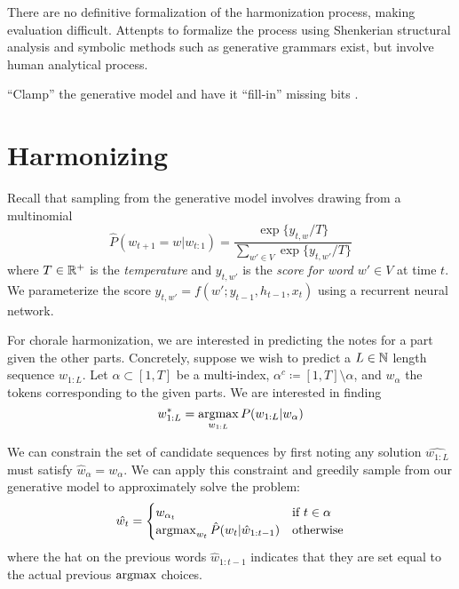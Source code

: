 \documentclass[dissertation.tex]{subfiles}
\begin{document}
There are no definitive formalization of the harmonization process, making
evaluation difficult. Attenpts to formalize the process using Shenkerian
structural analysis \cite{oswald1973harmony} and symbolic methods such as
generative grammars \cite{lerdahl1983jackendoff}\cite{winograd1968linguistics}
exist, but involve human analytical process.

``Clamp'' the generative model and have it ``fill-in'' missing bits
\cite{hinton1986learning}.

\section{Harmonizing}

Recall that sampling from the generative model involves drawing from a multinomial
\[
  \hat{P}(w_{t+1} = w | w_{t:1}) = \frac{\exp \{ y_{t,w} / T \}}{\sum_{w' \in V} \exp \{ y_{t,w'} / T \}}
\]
where $T \in \mathbb{R}^+$ is the \emph{temperature} and $y_{t,w'}$ is the \emph{score for word $w' \in V$}
at time $t$. We parameterize the score $y_{t,w'} = f(w'; y_{t-1}, h_{t-1}, x_t)$ using a recurrent
neural network.


For chorale harmonization, we are interested in predicting the notes for a part
given the other parts. Concretely, suppose we wish to predict a $L \in \mathbb{N}$
length sequence $w_{1:L}$. Let $\alpha \subset [1,T]$ be a multi-index,
$\alpha^c \coloneqq [1,T] \setminus \alpha$, and $w_\alpha$ the tokens
corresponding to the given parts. We are interested in finding
\begin{equation}
  w_{1:L}^* = \operatorname*{argmax}_{w_{1:L}} P(w_{1:L} | w_{\alpha})
\end{equation}

We can constrain the set of candidate sequences by first noting any solution
$\hat{w_{1:L}}$ must satisfy $\hat{w}_\alpha = w_\alpha$. We can apply this
constraint and greedily sample from our generative model to approximately solve
the problem:
\begin{equation}
  \hat{w_{t}} = \begin{cases}
    w_{\alpha_t} &\mbox{if}~t \in \alpha \\
    \operatorname*{argmax}_{w_t} \hat{P}(w_t | \hat{w}_{1:t-1}) &\mbox{otherwise}
  \end{cases}
\end{equation}
where the hat on the previous words $\hat{w}_{1:t-1}$ indicates that they are
set equal to the actual previous $\operatorname*{argmax}$ choices.
\end{document}
